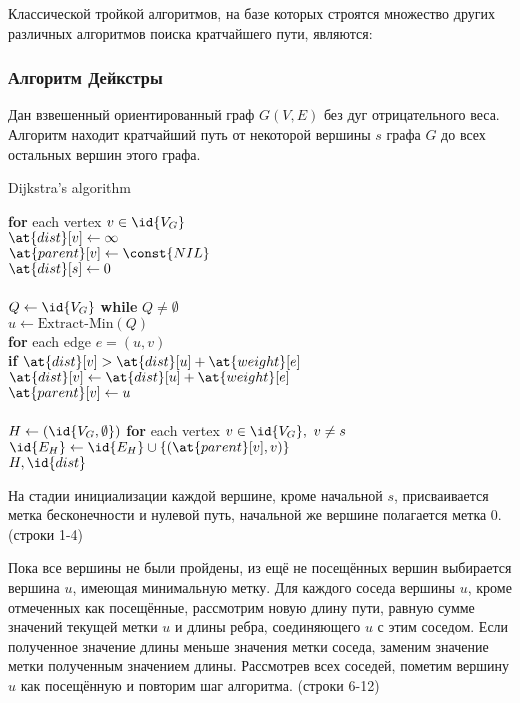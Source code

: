 \documentclass[12pt]{article}
\begin{document}
Классической тройкой алгоритмов, на базе которых строятся множество других различных алгоритмов поиска кратчайшего пути, являются:

\subsubsection{Алгоритм Дейкстры}

Дан взвешенный ориентированный граф $G(V,E)$ без дуг отрицательного веса. Алгоритм находит кратчайший путь от некоторой вершины $s$ графа $G$ до всех остальных вершин этого графа.

\begin{algorithm}
\caption{Dijkstra's algorithm}
\begin{algorithmic}[1]

\State \textbf{for} each vertex $v \in \id{V_G}$ \\
    \qquad $\at{dist}[v] \gets \infty$ \\
    \qquad $\at{parent}[v] \gets \const{NIL}$ \\
$\at{dist}[s] \gets 0$ \\
\\
$Q \gets \id{V_G}$
\State \textbf{while} $Q \neq \emptyset$ \\
\qquad $u \gets \text{Extract-Min}(Q)$ \\
\qquad \textbf{for} each edge $e = (u,v)$ \\
\qquad \qquad \textbf{if} $\at{dist}[v] > \at{dist}[u] + \at{weight}[e]$ \\
\qquad \qquad \qquad $\at{dist}[v] \gets \at{dist}[u] + \at{weight}[e]$ \\
\qquad \qquad \qquad $\at{parent}[v] \gets u$ \\
\\
$H \gets (\id{V_G, \emptyset})$
\State \textbf{for} each vertex $v \in \id{V_G},\ v \neq s$ \\
    \qquad $\id{E_H} \gets \id{E_H} \cup \{(\at{parent}[v], v)\}$ \\
\Return $H, \id{dist}$
\end{algorithmic}
\end{algorithm}

На стадии инициализации каждой вершине, кроме начальной $s$, присваивается метка бесконечности и нулевой путь, начальной же вершине полагается метка 0. (строки 1-4)

Пока все вершины не были пройдены, из ещё не посещённых вершин выбирается вершина $u$, имеющая минимальную метку. Для каждого соседа вершины $u$, кроме отмеченных как посещённые, рассмотрим новую длину пути, равную сумме значений текущей метки $u$ и длины ребра, соединяющего $u$ с этим соседом. Если полученное значение длины меньше значения метки соседа, заменим значение метки полученным значением длины. Рассмотрев всех соседей, пометим вершину $u$ как посещённую и повторим шаг алгоритма. (строки 6-12)
\end{document}
